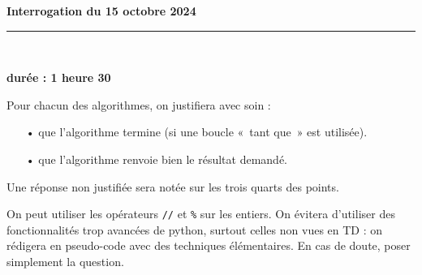\documentclass[11pt,a4paper]{article}
\title{}
\date{}
\newcommand{\HRule}{\rule{\linewidth}{0.5mm}}
\begin{document}
\pagestyle{fancy}

\fancyhead{}
 \fancyfoot{}


\newcommand{\lb}{\llbracket}
\newcommand{\rb}{\rrbracket}
\newcommand{\N}{\mathbb{N}}
\newcommand{\Z}{\mathbb{Z}}
\newcommand{\R}{\mathbb{R}}




\newcommand{\md}[3]{#1\ \equiv \ #2 \! \! \! \! \! \pmod {#3} }
\newcommand{\nmd}[3]{#1 \not \equiv #2 \! \! \! \! \!  \pmod {#3} }
\newcommand{\mda}[3]{#1 \equiv #2 \! \!  \pmod {#3} }
\newcommand{\nmda}[3]{#1 \not \equiv #2 \! \! \pmod {#3} }
\newcommand{\mo}[2]{#1 \! \! \! \! \! \pmod #2 }
\newcommand{\moa}[2]{#1 \! \!  \pmod {#2} }

\thispagestyle{fancy}

\begin{center}
    { \huge \bfseries
Interrogation du 15 octobre 2024
     \\ [0cm] }
    \HRule \\[0.5cm]
\end{center}

\begin{center}
\textbf{durée : 1 heure 30}
\end{center}



Pour chacun des algorithmes, on justifiera avec soin : \begin{itemize}
\item[•] que l'algorithme termine (si une boucle «~tant que~» est utilisée).

\item[•] que l'algorithme renvoie bien le résultat demandé.
\end{itemize}

Une réponse non justifiée sera notée sur les trois quarts des points.

On peut utiliser les opérateurs \verb+//+ et \verb+%+ sur les entiers. On évitera d'utiliser des fonctionnalités trop avancées de python, surtout celles non vues en TD : on rédigera en pseudo-code avec des techniques élémentaires. En cas de doute, poser simplement la question.
\end{document}

